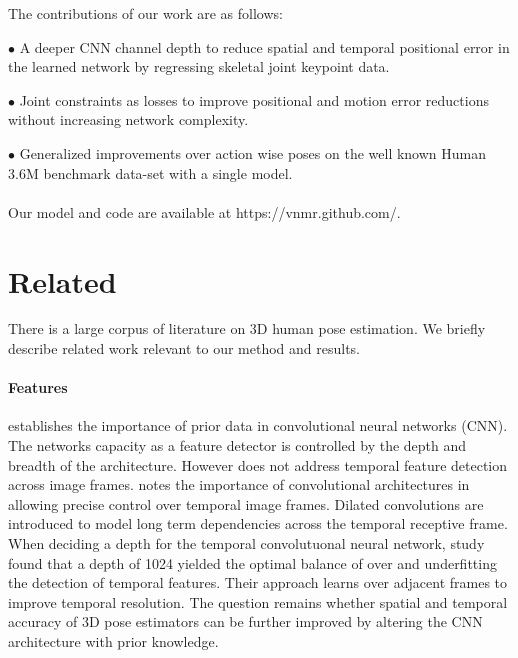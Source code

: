 \documentclass[runningheads]{llncs}
\begin{document}
The contributions of our work are as follows:

$\bullet$ A deeper CNN channel depth to reduce spatial and temporal positional error in the learned network by regressing skeletal joint keypoint data.

$\bullet$ Joint constraints as losses to improve positional and motion error reductions without increasing network complexity.

$\bullet$ Generalized improvements over action wise poses on the well known Human 3.6M benchmark data-set with a single model.
\\\\
Our model and code are available at https://vnmr.github.com/.

\section{Related}


There is a large corpus of literature on 3D human pose estimation. We briefly describe related work relevant to our method and results.

\iffalse
Goal: Computer Vision 3D Temporal Pose estimation:
1. Detect visual features in static images
  - CNN - priors + data
  - no temporal feature detection
2. Detect poses in static images
  1. Feature Engineering
    - require prior knowledge
  2. End to end CNN DL
    - rely on pixel data only
3. Detect temporal features across images
  - 2d stage
  - Smoothness
  - some use multi-view
  - some are end to end pixel
\fi

\paragraph {Features}

\cite{krizhevsky2012imagenet} establishes the importance of prior data in convolutional neural networks (CNN). The networks capacity as a feature detector is controlled by the depth and breadth of the architecture. However \cite{krizhevsky2012imagenet} does not address temporal feature detection across image frames. \cite{pavllo20193d} notes the importance of convolutional architectures in allowing precise control over temporal image frames. Dilated convolutions are introduced to model long term dependencies across the temporal receptive frame. When deciding a depth for the temporal convolutuonal neural network, \cite{pavllo20193d} study found that a depth of 1024 yielded the optimal balance of over and underfitting the detection of temporal features. Their approach learns over adjacent frames to improve temporal resolution. The question remains whether spatial and temporal accuracy of 3D pose estimators can be further improved by altering the CNN architecture with prior knowledge.
\end{document}
